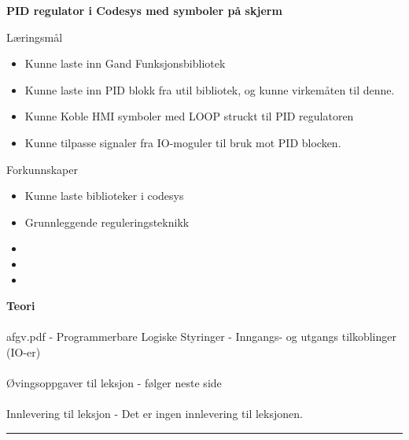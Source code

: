 \centerline{\bf PID regulator i Codesys med symboler på skjerm}  \bigskip
	Læringsmål
	\begin{itemize}[noitemsep]
		\item Kunne laste inn Gand Funksjonsbibliotek
		\item Kunne laste inn PID blokk fra util bibliotek, og kunne virkemåten til denne. 
		\item Kunne Koble HMI symboler med LOOP struckt til PID regulatoren
		\item Kunne tilpasse signaler fra IO-moguler til bruk mot PID blocken. 
	\end{itemize}

	Forkunnskaper

	\begin{itemize}[noitemsep]
		\item Kunne laste biblioteker i codesys
		\item Grunnleggende reguleringsteknikk
		\item 
		\item
		\item

	\end{itemize}
\textbf{Teori}\\\\
afgv.pdf - Programmerbare Logiske Styringer - Inngangs- og utgangs tilkoblinger (IO-er)\\\\
Øvingsoppgaver til leksjon - følger neste side\\\\
Innlevering til leksjon - Det er ingen innlevering til leksjonen. 
\bigskip 
\hrule
\vfil \eject
